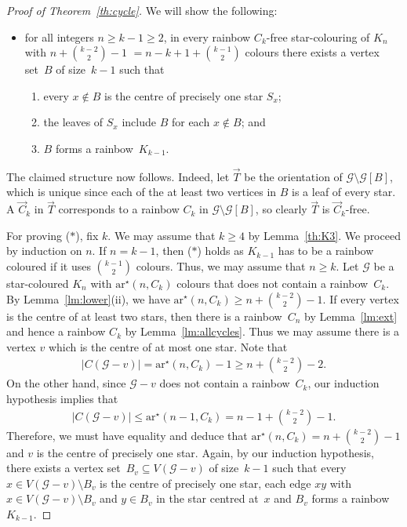 \documentclass[a4paper, 12pt]{article}
\numberwithin{equation}{section}
\def\sm{{\setminus}}
\def\sar{{\mathrm{ar}^{\star}}}
\newcommand{\ova}[1]{\overrightarrow{#1}}
\newcommand{\ms}[1]{\mathscr{#1}}
\begin{document}
\begin{proof}[Proof of Theorem~\ref{th:cycle}]
    We will show the following:
    \begin{itemize}
        \item[($\ast$)] for all integers $n \geq k-1 \geq 2$, in every rainbow $C_k$-free star-colouring of $K_n$ with $n+\binom{k-2}{2}-1$  $=n-k+1+{k-1\choose 2}$ colours there exists a vertex set~$B$ of size~$k-1$ such that 
        \begin{enumerate}
            \item every $x \notin B$ is the centre of precisely one star $S_x$;
            \item the leaves of $S_x$ include $B$ for each $x\notin B$; and
            \item  $B$ forms a rainbow~$K_{k-1}$.
        \end{enumerate} 
    \end{itemize}
    The claimed structure now follows. Indeed, let $\ova{T}$ be the orientation of $\ms{G}\sm\ms{G}[B]$, which is unique since each of the at least two vertices in $B$ is a leaf of every star. A $\ova{C}_k$ in $\ova{T}$ corresponds to a rainbow $C_k$ in $\ms{G}\sm\ms{G}[B]$, so clearly $\ova{T}$ is $\ova{C}_k$-free.

    For proving ($\ast$), fix $k$. We may assume that $k \ge 4$ by Lemma~\ref{th:K3}.
    We proceed by induction on $n$.
    If $n = k-1$, then ($\ast$) holds as $K_{k-1}$ has to be a rainbow coloured if it uses $\binom{k-1}{2}$ colours.
    Thus, we may assume that $n \ge k$. 
    Let $\ms{G}$ be a star-coloured $K_n$ with $\sar(n,C_k)$ colours that does not contain a rainbow~$C_k$. 
    By Lemma~\ref{lm:lower}(ii), we have $\sar(n,C_k) \ge n + \binom{k-2}2-1$. 
    If every vertex is the centre of at least two stars, then there is a rainbow~$C_n$ by Lemma~\ref{lm:ext} and hence a rainbow $C_k$ by Lemma~\ref{lm:allcycles}.
    Thus we may assume there is a vertex $v$ which is the centre of at most one star.
    Note that 
    \begin{align*}
         |C ( \ms{G}-v) | =  \sar(n,C_k) -1  \ge n + \binom{k-2}2-2.
    \end{align*}
    On the other hand, since $\ms{G}-v$ does not contain a rainbow~$C_k$, our induction hypothesis implies that 
     \begin{align*}
         |C ( \ms{G}-v) | \le  \sar(n-1,C_k) =  n -1 + \binom{k-2}2-1.
    \end{align*}
    Therefore, we must have equality and deduce  that $\sar(n,C_k)=n+\binom{k-2}{2}-1$ and $v$ is the centre of precisely one star. 
    Again, by our induction hypothesis, there exists a vertex set~$B_v \subseteq V(\ms{G} - v)$ of size~$k-1$ such that every $x \in V(\ms{G}-v) \setminus B_v$ is the centre of precisely one star, each edge $xy$ with $x \in V(\ms{G}-v) \setminus B_v$ and $y \in B_v$ in the star centred at~$x$ and $B_v$ forms a rainbow $K_{k-1}$.
    

\end{proof}
\end{document}
